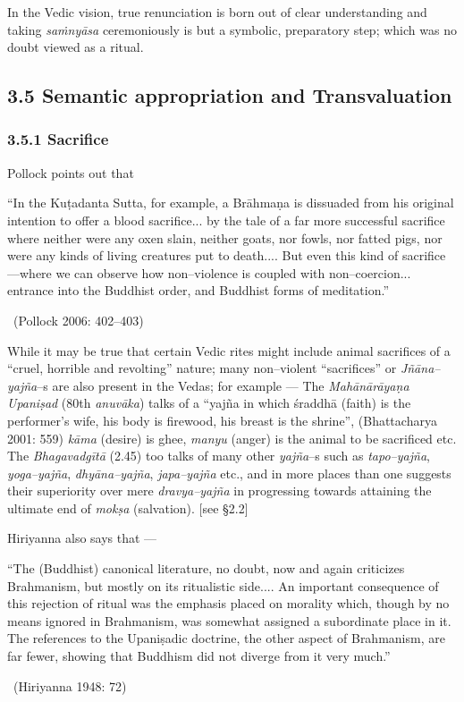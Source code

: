 In the Vedic vision, true renunciation is born out of clear understanding and taking \textit{saṁnyāsa} ceremoniously is but a symbolic, preparatory step; which was no doubt viewed as a ritual.


\subsection*{3.5 Semantic appropriation and Transvaluation}

\subsubsection*{3.5.1 Sacrifice}

Pollock points out that

\begin{myquote}
“In the Kuṭadanta Sutta, for example, a Brāhmaṇa is dissuaded from his original intention to offer a blood sacrifice... by the tale of a far more successful sacrifice where neither were any oxen slain, neither goats, nor fowls, nor fatted pigs, nor were any kinds of living creatures put to death.... But even this kind of sacrifice—where we can observe how non–violence is coupled with non–coercion... entrance into the Buddhist order, and Buddhist forms of meditation.” 

~\hfill (Pollock 2006: 402–403)
\end{myquote}

While it may be true that certain Vedic rites might include animal sacrifices of a “cruel, horrible and revolting” nature; many non–violent “sacrifices” or \textit{Jñāna–yajña}–s are also present in the Vedas; for example — The \textit{Mahānārāyaṇa Upaniṣad} (80th \textit{anuvāka}) talks of a “yajña in which śraddhā (faith) is the performer’s wife, his body is firewood, his breast is the shrine”, (Bhattacharya 2001: 559) \textit{kāma }(desire) is ghee, \textit{manyu} (anger) is the animal to be sacrificed etc. The \textit{Bhagavadgītā} (2.45) too talks of many other \textit{yajña}–s such as \textit{tapo–yajña}, \textit{yoga–yajña}, \textit{dhyāna–yajña}, \textit{japa–yajña} etc., and in more places than one suggests their superiority over mere \textit{dravya–yajña} in progressing towards attaining the ultimate end of \textit{mokṣa} (salvation). [see §2.2]

Hiriyanna also says that —

\begin{myquote}
“The (Buddhist) canonical literature, no doubt, now and again criticizes Brahmanism, but mostly on its ritualistic side.... An important consequence of this rejection of ritual was the emphasis placed on morality which, though by no means ignored in Brahmanism, was somewhat assigned a subordinate place in it. The references to the Upaniṣadic doctrine, the other aspect of Brahmanism, are far fewer, showing that Buddhism did not diverge from it very much.” 

~\hfill (Hiriyanna 1948: 72)
\end{myquote}

